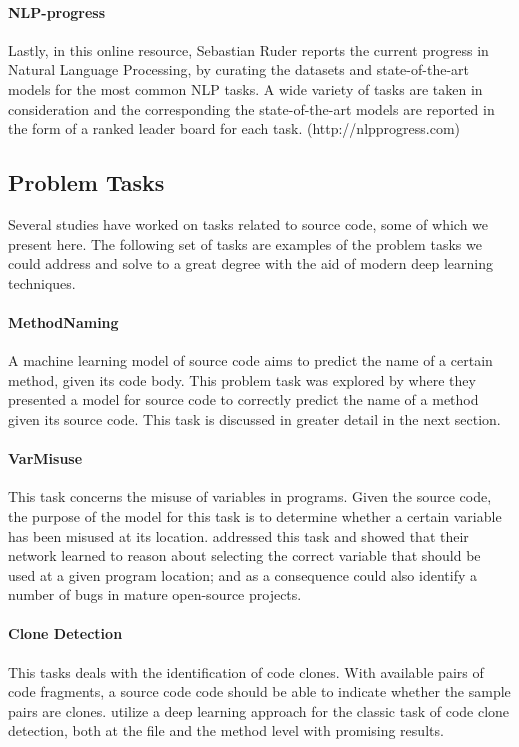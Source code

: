 \documentclass[sigplan,review,anonymous]{acmart}\settopmatter{printfolios=true,printccs=false,printacmref=false}
\begin{document}
\paragraph*{NLP-progress} Lastly, in this online resource, Sebastian Ruder \cite{nlpprogress1} reports the current progress in Natural Language Processing, by curating the datasets and state-of-the-art models for the most common NLP tasks. A wide variety of tasks are taken in consideration and the corresponding the state-of-the-art models are reported in the form of a ranked leader board for each task. (http://nlpprogress.com) 

\subsection{Problem Tasks}
Several studies have worked on tasks related to source code, some of which we present here. The following set of tasks are examples of the problem tasks we could address and solve to a great degree with the aid of modern deep learning techniques. 

\paragraph*{MethodNaming} A machine learning model of source code aims to predict the name of a certain method, given its code body. This problem task was explored by \citet{allamanis2015suggesting} where they presented a model for source code to correctly predict the name of a method given its source code. This task is discussed in greater detail in the next section.

\paragraph*{VarMisuse} This task concerns the misuse of variables in programs. Given the source code, the purpose of the model for this task is to determine whether a certain variable has been misused at its location. \citet{DBLP:journals/corr/abs-1711-00740} addressed this task and showed that their network learned to reason about selecting the correct variable that should be used at a given program location; and as a consequence could also identify a number of bugs in mature open-source projects.

\paragraph*{Clone Detection} This tasks deals with the identification of code clones. With available pairs of code fragments, a source code code should be able to indicate whether the sample pairs are clones. \citet{white2016deep} utilize a deep learning approach for the classic task of code clone detection, both at the file and the method level with promising results.  
\end{document}
